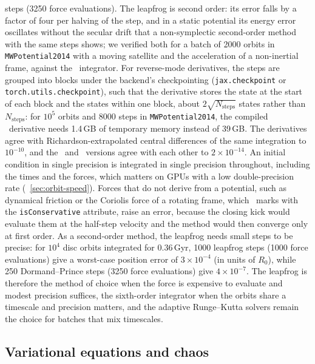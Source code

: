 steps (3250 force evaluations).
The leapfrog is second order: its error falls by a factor of four per
halving of the step, and in a static potential its energy error
oscillates without the secular drift that a non-symplectic
second-order method with the same steps shows; we verified both for a
batch of 2000 orbits in \texttt{MWPotential2014} with a moving
satellite and the acceleration of a non-inertial frame, against the
\cc\ integrator. For reverse-mode
derivatives, the steps are grouped into blocks under the backend's
checkpointing (\texttt{jax.checkpoint} or \texttt{torch.utils.checkpoint}),
such that the derivative stores the state at the start of each block and
the states within one block, about $2\sqrt{N_\mathrm{steps}}$ states
rather than $N_\mathrm{steps}$: for $10^5$ orbits and 8000 steps in
\texttt{MWPotential2014}, the compiled \jax\ derivative needs 1.4\,GB of
temporary memory instead of 39\,GB. The derivatives agree with
Richardson-extrapolated central differences of the same integration to
$10^{-10}$, and the \jax\ and \torch\ versions agree with each other to
$2\times10^{-14}$. An initial condition in single precision is
integrated in single precision throughout, including the times and the
forces, which matters on GPUs with a low double-precision rate
(\sectionname~\ref{sec:orbit-speed}). Forces that do not derive from a
potential, such as dynamical friction or the Coriolis force of a
rotating frame, which \galpy\ marks with the \texttt{isConservative}
attribute, raise an error, because the closing kick would evaluate
them at the half-step velocity and the method would then converge only
at first order. As a second-order method, the leapfrog needs small steps
to be precise: for $10^4$ disc orbits integrated for 0.36\,Gyr, 1000
leapfrog steps (1000 force evaluations) give a worst-case position
error of $3\times10^{-4}$ (in units of $R_0$), while 250 Dormand--Prince
steps (3250 force evaluations) give $4\times10^{-7}$. The leapfrog is
therefore the method of choice when the force is expensive to evaluate
and modest precision suffices, the sixth-order integrator when the
orbits share a timescale and precision matters, and the adaptive
Runge--Kutta solvers remain the choice for batches that mix
timescales.

\subsection{Variational equations and chaos}\label{sec:orbit-dxdv}

